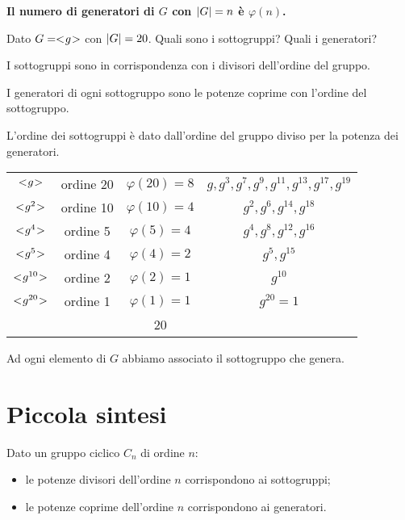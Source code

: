 \textbf{Il numero di generatori di $G$ con $\lvert G \rvert = n$ è $\varphi(n)$.}

\begin{esercizio}
	Dato $G = < \negmedspace g \negmedspace >$ con $\lvert G \rvert = 20$. Quali sono i sottogruppi? Quali i generatori?
\end{esercizio}
\begin{soluzione}
	I sottogruppi sono in corrispondenza con i divisori dell'ordine del gruppo.
	
	I generatori di ogni sottogruppo sono le potenze coprime con l'ordine del sottogruppo.
	
	L'ordine dei sottogruppi è dato dall'ordine del gruppo diviso per la potenza dei generatori.
	
	\begin{center}		
		\begin{tabular}{cccc}
			$< \negmedspace g \negmedspace >$ & ordine 20 & $\varphi(20) = 8$ & $g, g^3, g^7, g^9, g^{11}, g^{13}, g^{17}, g^{19}$ \\
			$< \negmedspace g^2 \negmedspace >$ & ordine 10 & $\varphi(10) = 4$ & $g^2, g^6, g^{14}, g^{18}$ \\
			$< \negmedspace g^4 \negmedspace >$ & ordine 5 & $\varphi(5) = 4$ & $g^4, g^8, g^{12}, g^{16}$ \\
			$< \negmedspace g^5 \negmedspace >$ & ordine 4 & $\varphi(4) = 2$ & $g^5, g^{15}$ \\
			$< \negmedspace g^{10} \negmedspace >$ & ordine 2 & $\varphi(2) = 1$ & $g^{10}$ \\
			$< \negmedspace g^{20} \negmedspace >$ & ordine 1 & $\varphi(1) = 1$ & $g^{20} = 1$ \\
			\bottomrule
			& & 20 &
		\end{tabular}
	\end{center}

	Ad ogni elemento di $G$ abbiamo associato il sottogruppo che genera.
\end{soluzione}

\section{Piccola sintesi}

Dato un gruppo ciclico $C_n$ di ordine $n$:

\begin{itemize}
	\item le potenze divisori dell'ordine $n$ corrispondono ai sottogruppi;
	\item le potenze coprime dell'ordine $n$ corrispondono ai generatori.
\end{itemize}

